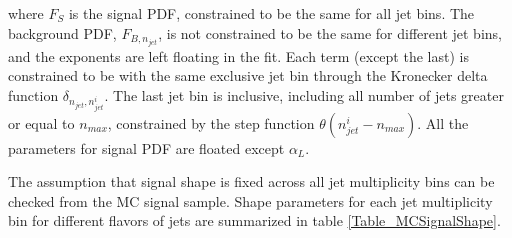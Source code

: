 \documentclass{cmspaper}
\begin{document}
where $F_S$ is the signal PDF, constrained to be the same for all jet bins.  The background PDF, $F_{B, n_{jet}}$, is not constrained to
be the same for different jet bins, and the exponents are left floating in the fit.  Each term (except the last) is constrained to be with the same exclusive jet bin
through the Kronecker delta function $\delta_{n_{jet}, n_{jet}^i}$.
The last jet bin is inclusive, including all number of jets greater or equal to $n_{max}$, constrained by the step function $\theta(n_{jet}^i - n_{max})$.
All the parameters for signal PDF are floated except $\alpha_L$.

The assumption that signal shape is fixed across all jet multiplicity bins can be checked from the MC signal sample.
Shape parameters for each jet multiplicity bin for different flavors of jets are summarized in table \ref{Table_MCSignalShape}.
\end{document}
